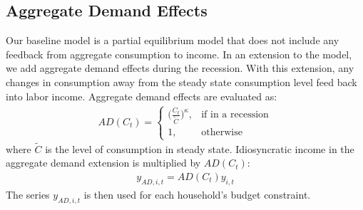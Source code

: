 \documentclass[../HAFiscal]{subfiles}
\begin{document}
	\subsection{Aggregate Demand Effects}
	Our baseline model is a partial equilibrium model that does not include any feedback from aggregate consumption to income. In an extension to the model, we add aggregate demand effects during the recession. With this extension, any changes in consumption away from the steady state consumption level feed back into labor income. Aggregate demand effects are evaluated as:
	\begin{align}
	AD(C_t) =   \begin{cases}
				\Big(\frac{C_t}{\tilde{C}}\Big)^\kappa, & \text{if in a recession} \\
				1, & \text{otherwise} 
				\end{cases}
	\end{align}
	where $\tilde{C}$ is the level of consumption in steady state. Idiosyncratic income in the aggregate demand extension is multiplied by $AD(C_t)$:
	\begin{align}
	y_{AD,i,t} = AD(C_t)y_{i,t}
	\end{align}
	The series $y_{AD,i,t}$ is then used for each household's budget constraint.
\end{document}
